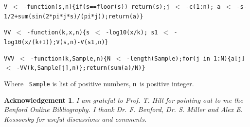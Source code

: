 \documentclass[titlepage,fleqn]{article}%
\newtheorem{acknowledgement}[theorem]{Acknowledgement}
\begin{document}
\texttt{V%
$<$%
-function(s,n)\{if(s==floor(s)) return(s);\newline j%
$<$%
-c(1:n); a%
$<$%
-s-1/2+sum(sin(2*pi*j*s)/(pi*j));\newline return(a)\}}

\medskip

\texttt{VV%
$<$%
-function(k,x,n)\{s%
$<$%
-log10(x/k);\newline\ s1%
$<$%
-log10(x/(k+1));\newline V(s,n)-V(s1,n)\}}

\medskip

\texttt{VVV%
$<$%
-function(k,Sample,n)\{N%
$<$%
-length(Sample);\newline for(j in 1:N)\{a[j]%
$<$%
-VV(k,Sample[j],n)\};\newline return(sum(a)/N)\}\medskip}

Where \ \texttt{Sample} is list of positive numbers, \texttt{n}\ is positive integer.

\begin{acknowledgement}
I am grateful to Prof. T. Hill for pointing out to me the Benford Online
Bibliography. I thank Dr. F. Benford, Dr. S. Miller and Alex E. Kossovsky for
useful discussions and comments.
\end{acknowledgement}
\end{document}
